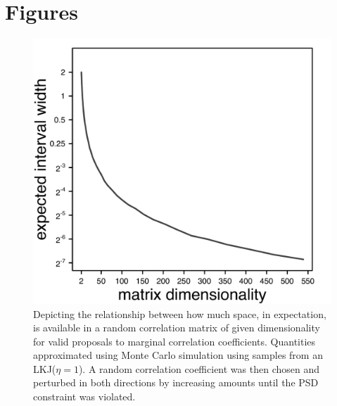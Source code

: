 \clearpage

\section{Figures}

\begin{figure}[h]
\centering
\includegraphics[width=145mm]{figures/expected_wiggle_room.pdf}
\caption[Expected Valid Sliding Window Width for Correlation Matrix Across Dimensions]{Depicting the relationship between how much space, in expectation, is available in a random correlation matrix of given dimensionality for valid proposals to marginal correlation coefficients. Quantities approximated using Monte Carlo simulation using samples from an LKJ($\eta = 1$). A random correlation coefficient was then chosen and perturbed in both directions by increasing amounts until the PSD constraint was violated. \label{overflow}
\label{fig:expWiggleRoom}}
\end{figure}

